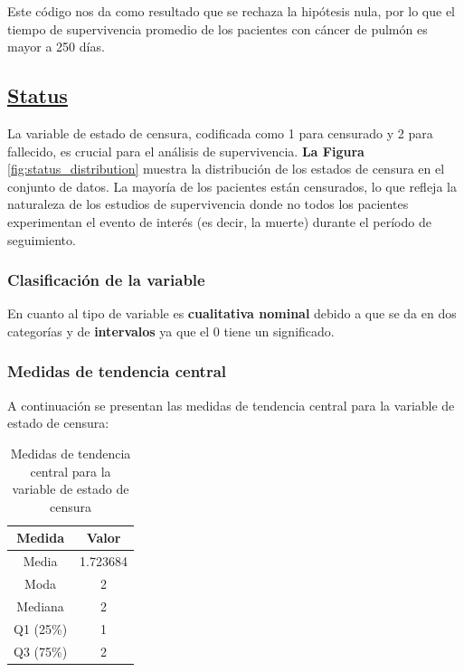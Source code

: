 \documentclass[a4paper,12pt]{article}
\begin{document}
    Este código nos da como resultado que se rechaza la hipótesis nula, por lo que el tiempo de supervivencia promedio de los pacientes con cáncer de pulmón es mayor a 250 días.

    \subsection*{\underline{Status}}

    La variable de estado de censura, codificada como 1 para censurado y 2 para fallecido, es crucial para el análisis de supervivencia. \textbf{La Figura }\ref{fig:status_distribution} muestra la distribución de los estados de censura en el conjunto de datos. La mayoría de los pacientes están censurados, lo que refleja la naturaleza de los estudios de supervivencia donde no todos los pacientes experimentan el evento de interés (es decir, la muerte) durante el período de seguimiento. 
    
    \subsubsection*{Clasificación de la variable}

    En cuanto al tipo de variable es \textbf{cualitativa nominal} debido a que se da en dos categorías y de \textbf{intervalos} ya que el 0 tiene un significado.

    \subsubsection*{Medidas de tendencia central}

A continuación se presentan las medidas de tendencia central para la variable de estado de censura:

\begin{table}[h!]
    \centering
    \begin{tabular}{|c|c|}
        \hline
        \textbf{Medida} & \textbf{Valor} \\
        \hline
        Media & 1.723684 \\
        \hline
        Moda & 2 \\
        \hline
        Mediana & 2 \\
        \hline
        Q1 (25\%) & 1 \\
        \hline
        Q3 (75\%) & 2 \\
        \hline
    \end{tabular}
    \caption{Medidas de tendencia central para la variable de estado de censura}
    \label{tab:medidas_tendencia_central_status}
\end{table}
\end{document}
